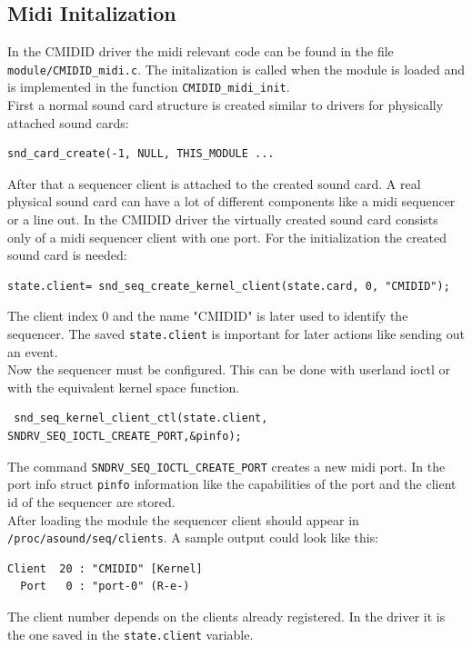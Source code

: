 \documentclass[paper=a4,fontsize=11pt,twocolumn,pagesize,bibtotoc]{scrartcl}
\begin{document}
\subsection{Midi Initalization}
In the CMIDID driver the midi relevant code can be found in the file \texttt{module/CMIDID\_midi.c}. The initalization is called when the module is loaded and is implemented in the function \texttt{CMIDID\_midi\_init}.\\
First a normal sound card structure is created similar to drivers for physically attached sound cards: \begin{lstlisting}
snd_card_create(-1, NULL, THIS_MODULE ...
\end{lstlisting}
After that a sequencer client is attached to the created sound card. A real physical sound card can have a lot of different components like a midi sequencer or a line out. In the CMIDID driver the virtually created sound card consists only of a midi sequencer client with one port. For the initialization the created sound card is needed:
\begin{lstlisting}
state.client= snd_seq_create_kernel_client(state.card, 0, "CMIDID");
\end{lstlisting}
The client index 0 and the name "CMIDID" is later used to identify the sequencer. The saved \texttt{state.client} is important for later actions like sending out an event.\\ 
Now the sequencer must be configured. This can be done with userland ioctl or with the equivalent kernel space function.
\begin{lstlisting}
 snd_seq_kernel_client_ctl(state.client, SNDRV_SEQ_IOCTL_CREATE_PORT,&pinfo);
\end{lstlisting}
The command \texttt{SNDRV\_SEQ\_IOCTL\_CREATE\_PORT} creates a new midi port. In the port info struct \texttt{pinfo} information like the  capabilities of the port and the client id of the sequencer are stored.
\\
After loading the module the sequencer client should appear in \texttt{/proc/asound/seq/clients}. A sample output could look like this:
\begin{lstlisting}
Client  20 : "CMIDID" [Kernel]
  Port   0 : "port-0" (R-e-)
\end{lstlisting}
The client number depends on the clients already registered. In the driver it is the one saved in the \texttt{state.client} variable.
\end{document}
